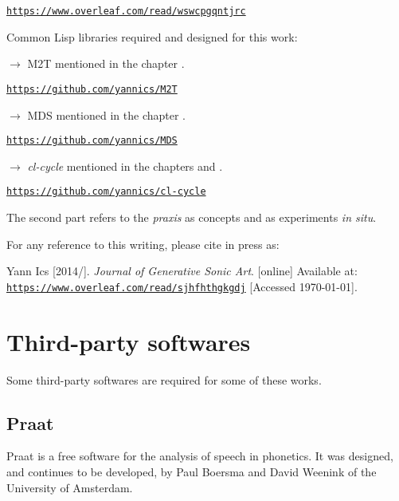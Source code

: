 \href{https://www.overleaf.com/read/wswcpgqntjrc}{\texttt{\small https://www.overleaf.com/read/wswcpgqntjrc}}

\bigskip
Common Lisp libraries required and designed for this work:

\smallskip

\noindent $\rightarrow$ M2T mentioned in the chapter \textsl{}.

\href{https://github.com/yannics/M2T}{\texttt{\small https://github.com/yannics/M2T}}

\smallskip

\noindent $\rightarrow$ MDS mentioned in the chapter  \textsl{}.

\href{https://github.com/yannics/MDS}{\texttt{\small https://github.com/yannics/MDS}}

\smallskip

\noindent $\rightarrow$ \textsl{cl-cycle} mentioned in the chapters \textsl{} and  \textsl{}. 

\href{https://github.com/yannics/cl-cycle}{\texttt{\small https://github.com/yannics/cl-cycle}}

\newpage
The second part refers to the \textit{praxis} as concepts and as experiments \textit{in situ}. 

\bigskip

For any reference to this writing, please cite in press as: 

\noindent Yann Ics [2014/\the\year]. \textit{Journal of Generative Sonic Art}. [online] Available at: \href{https://www.overleaf.com/read/sjhfhthgkgdj}{\texttt{\small https://www.overleaf.com/read/sjhfhthgkgdj}} [Accessed \today].

\section*{Third-party softwares}
\label{tps}

Some third-party softwares are required for some of these works. 

\subsection*{Praat}

Praat is a free software for the analysis of speech in phonetics. It was designed, and continues to be developed, by Paul Boersma and David Weenink of the University of Amsterdam. 

